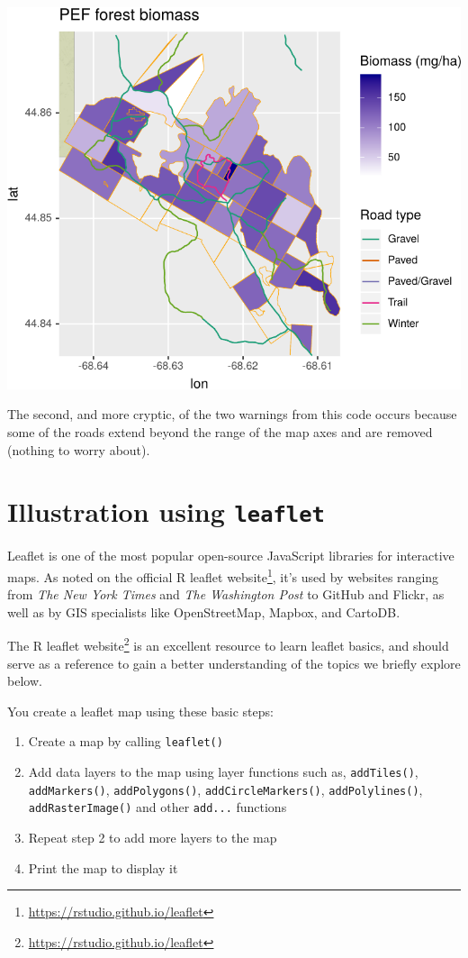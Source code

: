 \documentclass[]{krantz}
\providecommand{\tightlist}{%
  \setlength{\itemsep}{0pt}\setlength{\parskip}{0pt}}
\renewcommand{\href}[2]{#2\footnote{\url{#1}}}
\begin{document}
\includegraphics{bookdown_files/figure-latex/unnamed-chunk-195-1.pdf}

The second, and more cryptic, of the two warnings from this code occurs because some of the roads extend beyond the range of the map axes and are removed (nothing to worry about).

\hypertarget{illustration-using-leaflet}{%
\section{\texorpdfstring{Illustration using \texttt{leaflet}}{Illustration using leaflet}}\label{illustration-using-leaflet}}

Leaflet is one of the most popular open-source JavaScript libraries for interactive maps. As noted on the official \href{https://rstudio.github.io/leaflet}{R leaflet website}, it's used by websites ranging from \emph{The New York Times} and \emph{The Washington Post} to GitHub and Flickr, as well as by GIS specialists like OpenStreetMap, Mapbox, and CartoDB.

The \href{https://rstudio.github.io/leaflet}{R leaflet website} is an excellent resource to learn leaflet basics, and should serve as a reference to gain a better understanding of the topics we briefly explore below.

You create a leaflet map using these basic steps:

\begin{enumerate}
\def\labelenumi{\arabic{enumi}.}
\tightlist
\item
  Create a map by calling \texttt{leaflet()}
\item
  Add data layers to the map using layer functions such as, \texttt{addTiles()}, \texttt{addMarkers()}, \texttt{addPolygons()}, \texttt{addCircleMarkers()}, \texttt{addPolylines()}, \texttt{addRasterImage()} and other \texttt{add...} functions
\item
  Repeat step 2 to add more layers to the map
\item
  Print the map to display it
\end{enumerate}
\end{document}
